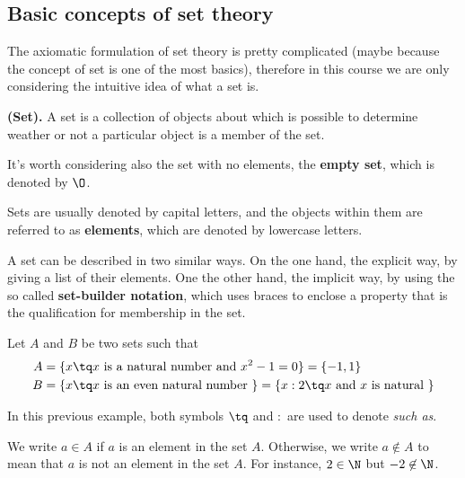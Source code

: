 
\subsection{Basic concepts of set theory}
The axiomatic formulation of set theory is pretty complicated (maybe because the concept of set is one of the most basics), therefore in this course we are only considering the intuitive idea of what a set is.

\begin{definition}
    \textbf{(Set).} A set is a collection of objects about which is possible to determine weather or not a particular object is a member of the set.
\end{definition}
\begin{note}
    It's worth considering also the set with no elements, the \textbf{empty set}, which is denoted by $\O$.
\end{note}

Sets are usually denoted by capital letters, and the objects within them are referred to as \textbf{elements}, which are denoted by lowercase letters. 

A set can be described in two similar ways. On the one hand, the explicit way, by giving a list of their elements. One the other hand, the implicit way, by using the so called \textbf{set-builder notation}, which uses braces to enclose a property that is the qualification for membership in the set.
\begin{example}
    Let $A$ and $B$ be two sets such that
    \begin{align}
        A &= \lbrace x\tq x \textrm{ is a natural number and } x^2 - 1 = 0 \rbrace = \lbrace -1, 1\rbrace \\
        B &= \lbrace x\tq x \textrm{ is an even natural number } \rbrace = \lbrace x : 2\tq x \textrm{ and $x$ is natural } \rbrace
    \end{align}
\end{example}

\begin{notation}
    In this previous example, both symbols $\tq$ and $ : $ are used to denote \textit{such as}.
\end{notation}

We write $a\in A$ if $a$ is an element in the set $A$. Otherwise, we write $a\notin A$ to mean that $a$ is not an element in the set $A$. For instance, $2\in\N$ but $-2\not\in \N$.

